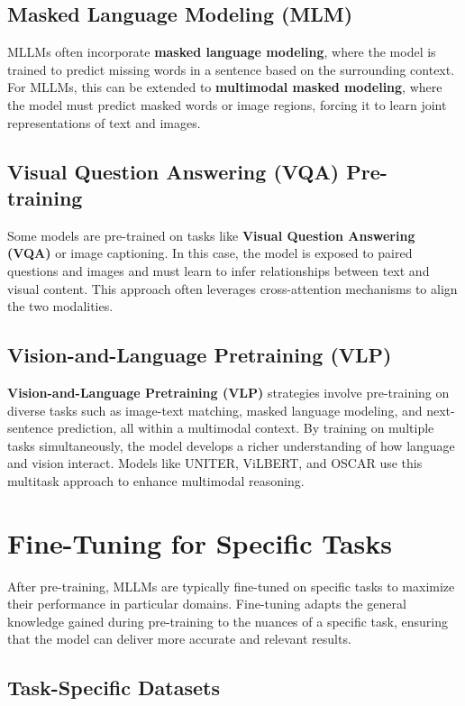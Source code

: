 \subsection{Masked Language Modeling (MLM)}

MLLMs often incorporate \textbf{masked language modeling}, where the model is trained to predict missing words in a sentence based on the surrounding context. For MLLMs, this can be extended to \textbf{multimodal masked modeling}, where the model must predict masked words or image regions, forcing it to learn joint representations of text and images.

\subsection{Visual Question Answering (VQA) Pre-training}

Some models are pre-trained on tasks like \textbf{Visual Question Answering (VQA)} or image captioning. In this case, the model is exposed to paired questions and images and must learn to infer relationships between text and visual content. This approach often leverages cross-attention mechanisms to align the two modalities.

\subsection{Vision-and-Language Pretraining (VLP)}

\textbf{Vision-and-Language Pretraining (VLP)} strategies involve pre-training on diverse tasks such as image-text matching, masked language modeling, and next-sentence prediction, all within a multimodal context. By training on multiple tasks simultaneously, the model develops a richer understanding of how language and vision interact. Models like UNITER, ViLBERT, and OSCAR use this multitask approach to enhance multimodal reasoning.

\section{Fine-Tuning for Specific Tasks}

After pre-training, MLLMs are typically fine-tuned on specific tasks to maximize their performance in particular domains. Fine-tuning adapts the general knowledge gained during pre-training to the nuances of a specific task, ensuring that the model can deliver more accurate and relevant results.

\subsection{Task-Specific Datasets}

